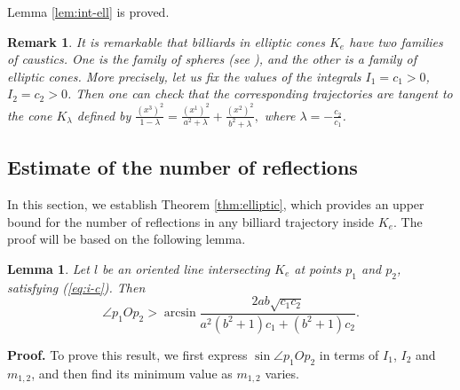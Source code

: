 \documentclass[12pt]{article}
\newtheorem{lemma}{Lemma}
\newtheorem{remark}{Remark}
\begin{document}
Lemma \ref{lem:int-ell} is proved.

\begin{remark}
  It is remarkable that billiards in elliptic cones $K_e$ have two families of caustics.
  One is the family of spheres (see \cite{MY}), and the other is a family of elliptic cones. More precisely, let us fix the values of the integrals $I_1=c_1>0$, $I_2=c_2>0$. Then one can check that 
  the corresponding trajectories are tangent to the cone 
  $K_{\lambda}$ defined by
  $
  \frac{(x^3)^2}{1 -\lambda} = \frac{(x^1)^2}{a^2+\lambda} + \frac{(x^2)^2 }{b^2+\lambda},
  $ where  $\lambda = -\frac{c_2}{c_1}$.
\end{remark}

\subsection{Estimate of the number of reflections}
In this section, we establish Theorem \ref{thm:elliptic}, 
which provides an upper bound for the number of reflections in any billiard trajectory inside $K_e$. 
The proof will be based on the following lemma.

\begin{lemma}\label{lem:est-ell}
  Let $l$ be an oriented line intersecting $K_e$ at points $p_1$ and $p_2$, 
  satisfying (\ref{eq:i-c}).
  Then 
  $$
  \angle p_1 O p_2 
  > \arcsin 
  \frac{2 a b \sqrt{c_1 c_2}}{a^2(b^2+1)c_1 + (b^2+1)c_2}.
  $$
\end{lemma}
\textbf{Proof.}
To prove this result, we first express $\sin \angle p_1 O p_2$ in terms of $I_1$, $I_2$ and $m_{1,2}$, and then find its minimum value as $m_{1,2}$ varies.
\end{document}
